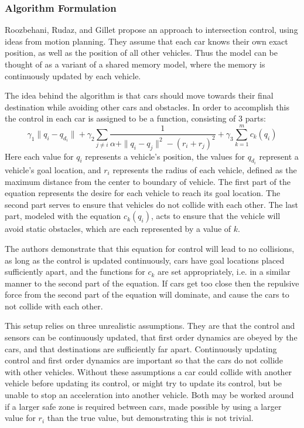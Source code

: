 \documentclass[12pt]{article}
\begin{document}
\subsubsection{Algorithm Formulation}
Roozbehani, Rudaz, and Gillet propose an approach to intersection control, using ideas from motion planning. They assume that each car knows their own exact position, as well as the position of all other vehicles. Thus the model can be thought of as a variant of a shared memory model, where the memory is continuously updated by each vehicle. \par
The idea behind the algorithm is that cars should move towards their final destination while avoiding other cars and obstacles. In order to accomplish this the control in each car is assigned to be a function, consisting of 3 parts:
\begin{equation}
\gamma_1\|q_i - q_{d_i}\| + \gamma_2\sum_{j \neq i} \frac{1}{\alpha + \|q_i - q_j\|^2 - (r_i + r_j)^2} + \gamma_3\sum_{k=1}^m c_k(q_i)
\end{equation}
Here each value for $q_i$ represents a vehicle's position, the values for $q_{d_i}$ represent a vehicle's goal location, and $r_i$ represents the radius of each vehicle, defined as the maximum distance from the center to boundary of vehicle. The first part of the equation represents the desire for each vehicle to reach its goal location. The second part serves to ensure that vehicles do not collide with each other. The last part, modeled with the equation $c_k(q_i)$, acts to ensure that the vehicle will avoid static obstacles, which are each represented by a value of $k$.\par
The authors demonstrate that this equation for control will lead to no collisions, as long as the control is updated continuously, cars have goal locations placed sufficiently apart, and the functions for $c_k$ are set appropriately, i.e. in a similar manner to the second part of the equation. If cars get too close then the repulsive force from the second part of the equation will dominate, and cause the cars to not collide with each other. \par
This setup relies on three unrealistic assumptions. They are that the control and sensors can be continuously updated, that first order dynamics are obeyed by the cars, and that destinations are sufficiently far apart. Continuously updating control and first order dynamics are important so that the cars do not collide with other vehicles. Without  these assumptions a car could collide with another vehicle before updating its control, or might try to update its control, but be unable to stop an acceleration into another vehicle. Both may be worked around if a larger safe zone is required between cars, made possible by using a larger value for $r_i$ than the true value, but demonstrating this is not trivial. \par
\end{document}
